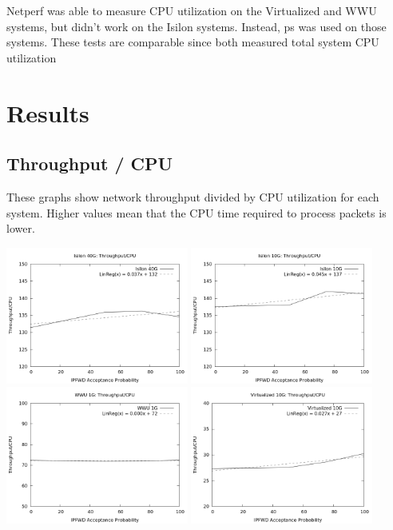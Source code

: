 \documentclass[journal]{IEEEtran}
\begin{document}
  Netperf was able to measure CPU utilization on the Virtualized and WWU
  systems, but didn't work on the Isilon systems. Instead, ps was used on those
  systems.  These tests are comparable since both measured total system CPU
  utilization


\section{Results}
  
  \subsection{Throughput / CPU}
  These graphs show network throughput divided by CPU utilization for each system. Higher values mean that the CPU time required to process packets is lower.
  
  \begin{center}
  \includegraphics[width=0.45\textwidth]{toc_isilon40}
  \includegraphics[width=0.45\textwidth]{toc_isilon10}
  \includegraphics[width=0.45\textwidth]{toc_wwu1}
  \includegraphics[width=0.45\textwidth]{toc_virtual10}
  \end{center}
  
\end{document}
